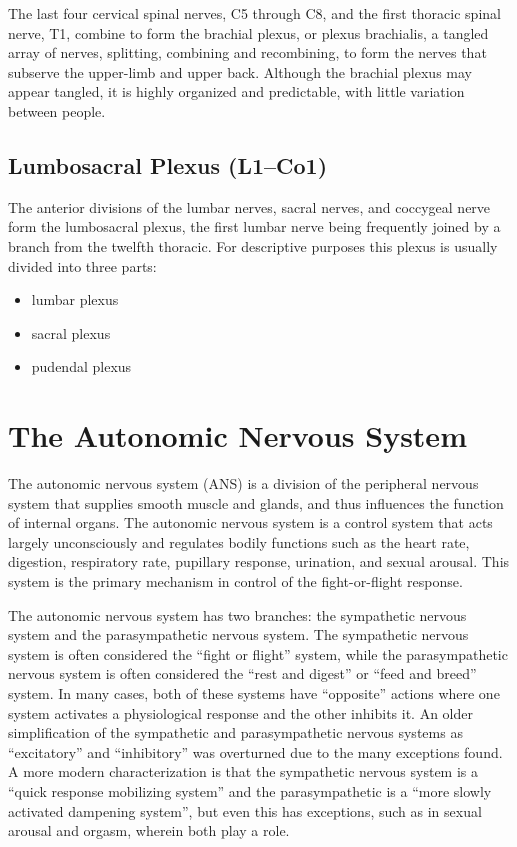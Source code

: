 \documentclass[]{book}
\providecommand{\tightlist}{%
  \setlength{\itemsep}{0pt}\setlength{\parskip}{0pt}}
\begin{document}
The last four cervical spinal nerves, C5 through C8, and the first thoracic spinal nerve, T1, combine to form the brachial plexus, or plexus brachialis, a tangled array of nerves, splitting, combining and recombining, to form the nerves that subserve the upper-limb and upper back. Although the brachial plexus may appear tangled, it is highly organized and predictable, with little variation between people.

\hypertarget{lumbosacral-plexus-l1co1}{%
\subsection{Lumbosacral Plexus (L1--Co1)}\label{lumbosacral-plexus-l1co1}}

The anterior divisions of the lumbar nerves, sacral nerves, and coccygeal nerve form the lumbosacral plexus, the first lumbar nerve being frequently joined by a branch from the twelfth thoracic. For descriptive purposes this plexus is usually divided into three parts:

\begin{itemize}
\tightlist
\item
  lumbar plexus
\item
  sacral plexus
\item
  pudendal plexus
\end{itemize}

\hypertarget{the-autonomic-nervous-system}{%
\section{The Autonomic Nervous System}\label{the-autonomic-nervous-system}}

The autonomic nervous system (ANS) is a division of the peripheral nervous system that supplies smooth muscle and glands, and thus influences the function of internal organs. The autonomic nervous system is a control system that acts largely unconsciously and regulates bodily functions such as the heart rate, digestion, respiratory rate, pupillary response, urination, and sexual arousal. This system is the primary mechanism in control of the fight-or-flight response.

The autonomic nervous system has two branches: the sympathetic nervous system and the parasympathetic nervous system. The sympathetic nervous system is often considered the ``fight or flight'' system, while the parasympathetic nervous system is often considered the ``rest and digest'' or ``feed and breed'' system. In many cases, both of these systems have ``opposite'' actions where one system activates a physiological response and the other inhibits it. An older simplification of the sympathetic and parasympathetic nervous systems as ``excitatory'' and ``inhibitory'' was overturned due to the many exceptions found. A more modern characterization is that the sympathetic nervous system is a ``quick response mobilizing system'' and the parasympathetic is a ``more slowly activated dampening system'', but even this has exceptions, such as in sexual arousal and orgasm, wherein both play a role.
\end{document}
